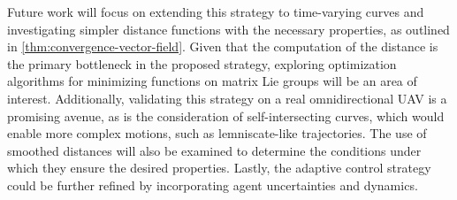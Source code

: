Future work will focus on extending this strategy to time-varying curves and investigating simpler distance functions with the necessary properties, as outlined in \cref{thm:convergence-vector-field}. Given that the computation of the distance is the primary bottleneck in the proposed strategy, exploring optimization algorithms for minimizing functions on matrix Lie groups will be an area of interest. Additionally, validating this strategy on a real omnidirectional UAV is a promising avenue, as is the consideration of self-intersecting curves, which would enable more complex motions, such as lemniscate-like trajectories. The use of smoothed distances will also be examined to determine the conditions under which they ensure the desired properties.  Lastly, the adaptive control strategy could be further refined by incorporating agent uncertainties and dynamics.